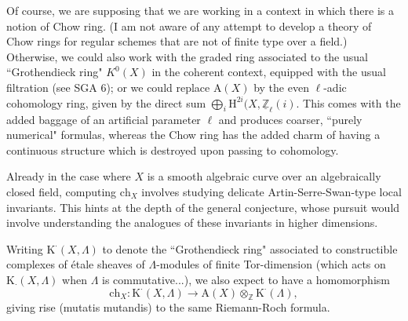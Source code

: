 Of course, we are supposing that we are working in a context in which there is a notion of Chow ring. (I am not aware of any attempt to develop a theory of Chow rings for regular schemes that are not of finite type over a field.) Otherwise, we could also work with the graded ring associated to the usual ``Grothendieck ring" $K^0(X)$ in the coherent context, equipped with the usual filtration (see SGA 6); or we could replace $\text{A}(X)$ by the even $\ell$-adic cohomology ring, given by the direct sum $\bigoplus_i \text{H}^{2i}(X, \underline{\mathbb{Z}}_\ell(i)$. This comes with the added baggage of an artificial parameter $\ell$ and produces coarser, ``purely numerical" formulas, whereas the Chow ring has the added charm of having a continuous structure which is destroyed upon passing to cohomology.

Already in the case where $X$ is a smooth algebraic curve over an algebraically closed field, computing $\text{ch}_X$ involves studying delicate Artin-Serre-Swan-type local invariants. This hints at the depth of the general conjecture, whose pursuit would involve understanding the analogues of these invariants in higher dimensions. 

\begin{remark*}
Writing $\text{K}^{\cdot}(X, \Lambda)$ to denote the ``Grothendieck ring" associated to constructible complexes of \'etale sheaves of $\Lambda$-modules of finite Tor-dimension (which acts on $\text{K}_{\cdot}(X, \Lambda)$ when $\Lambda$ is commutative...), we also expect to have a homomorphism
\begin{equation}\label{chern1.2} 
\text{ch}_X: \text{K}^{\cdot}(X, \Lambda) \to \text{A}(X) \otimes_{\mathbb{Z}} \text{K}^\cdot(\Lambda), 
\end{equation}
giving rise (mutatis mutandis) to the same Riemann-Roch formula.
\end{remark*}

